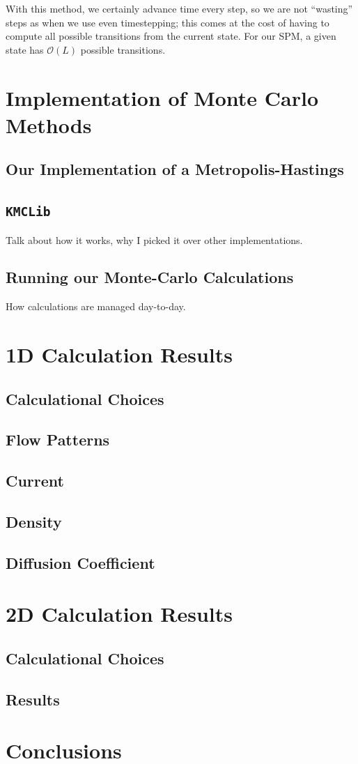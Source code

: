 With this method, we certainly advance time every step, so we are not ``wasting'' steps as when we use even 
timestepping; this comes at the cost of having to compute all possible transitions from the current state.
For our SPM, a given state has $\mathcal{O}(L)$ possible transitions.


\section{Implementation of Monte Carlo Methods}
\subsection{Our Implementation of a Metropolis-Hastings}
\subsection{\texttt{KMCLib}} \label{sec:kmcLib}
Talk about how it works, why I picked it over other implementations.
\subsection{Running our Monte-Carlo Calculations}
How calculations are managed day-to-day.

\section{1D Calculation Results}
\subsection{Calculational Choices}
\subsection{Flow Patterns}
\subsection{Current}
\subsection{Density}
\subsection{Diffusion Coefficient}

\section{2D Calculation Results}
\subsection{Calculational Choices}
\subsection{Results}

\section{Conclusions}

